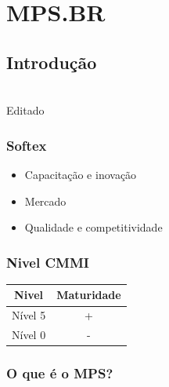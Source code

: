 \documentclass{article}
\begin{document}
\section{MPS.BR} 
\subsection{Introdução} \date{26 de Março de 2014}\\
Editado \date{10 de Setembro de 2014}

\subsubsection{Softex} 
	\begin{itemize}
	\item Capacitação e inovação
	\item Mercado
	\item Qualidade e competitividade
	\end{itemize}
	
\subsubsection{Nivel CMMI}
	
\begin{center}

\begin{tabular}{|c|c|}
\hline 
Nivel & Maturidade \\ 
\hline 
Nível 5 & + \\ 
\hline 
Nível 0 & - \\ 
\hline 
\end{tabular} 

\end{center}

	
\subsubsection{O que é o MPS?} 
	
\end{document}
